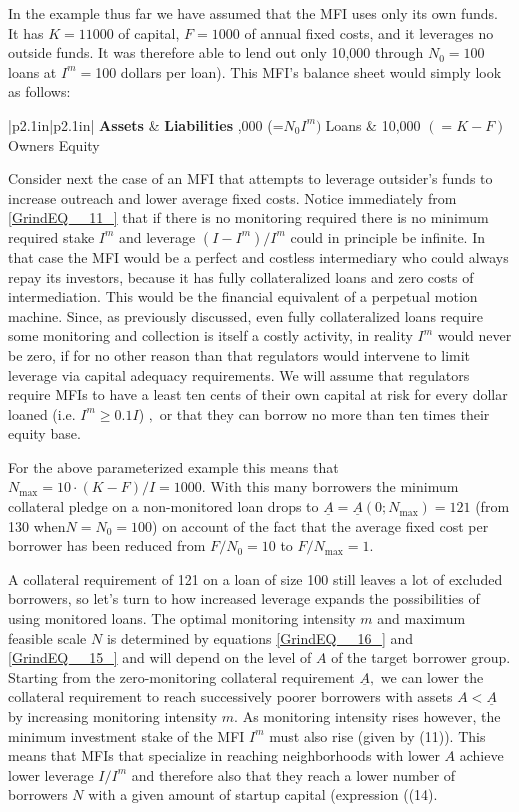\documentclass{article} %
\begin{document}
In the example thus far we have assumed that the MFI uses only its own funds.  It has $K=11000$ of capital, $F=1000$ of annual fixed costs, and it leverages no outside funds. It was therefore able to lend out only 10,000 through $N_{0} =100$ loans at $I^{m} =$100 dollars per loan). This MFI's balance sheet would simply look as follows: 

\begin{tabular}{|p{2.1in}|p{2.1in}|} \hline 
\textbf{Assets} & \textbf{Liabilities}  ,000 (=$N_{0} I^{m} )\; $Loans & 10,000 $(=K-F)$ Owners Equity  \hline 
\end{tabular}



Consider next the case of an MFI that attempts to leverage outsider's funds to increase outreach and lower average fixed costs.  Notice immediately from \eqref{GrindEQ__11_} that if there is no monitoring required there is no minimum required stake $I^{m} $ and leverage $(I-I^{m} )/I^{m} $ could in principle be infinite.  In that case the MFI would be a perfect and costless intermediary who could always repay its investors, because it has fully collateralized loans and zero costs of intermediation.  This would be the financial equivalent of a perpetual motion machine.  Since, as previously discussed, even fully collateralized loans require some monitoring and collection is itself a costly activity, in reality $I^{m} $ would never be zero,  if for no other reason than that regulators would intervene to limit leverage via capital adequacy requirements.  We will assume that regulators require MFIs to have a least ten cents of their own capital at risk for every dollar loaned (i.e. $I^{m} \ge 0.1I$) $,$ or that they can borrow no more than ten times their equity base.  

For the above parameterized example this means that $N_{\max } =10\cdot (K-F)/I=1000.$ With this many borrowers the minimum collateral pledge on a non-monitored loan drops to $\underline{A}=\underline{A}(0;N_{\max } )=121$ (from 130 when$N=N_{0} =100$) on account of the fact that the average fixed cost per borrower has been reduced from $F/N_{0} =10$ to $F/N_{\max } =1$.  

A collateral requirement of 121 on a loan of size 100 still leaves a lot of excluded borrowers, so let's turn to how increased leverage expands the possibilities of using monitored loans. The optimal monitoring intensity $m$ and maximum feasible scale $N$ is determined by equations \eqref{GrindEQ__16_} and \eqref{GrindEQ__15_} and will depend on the level of $A$ of the target borrower group.  Starting from the zero-monitoring collateral requirement $\underline{A},$ we can lower the collateral requirement to reach successively poorer borrowers with assets $A<\underline{A}$ by increasing monitoring intensity $m.$  As monitoring intensity rises however, the minimum investment stake of the MFI $I^{m} $ must also rise (given by (11)). This means that MFIs that specialize in reaching neighborhoods with lower $A$ achieve lower leverage $I/I^{m} $ and therefore also that they reach a lower number of borrowers $N$ with a given amount of startup capital (expression ((14).  
\end{document}
